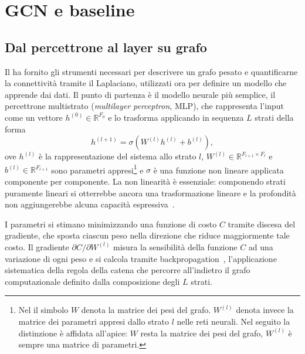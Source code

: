 \chapter{GCN e baseline}
\label{ch:forecasting-models}

\section{Dal percettrone al layer su grafo}
\label{sec:from-perceptron-to-graph-layer}

Il  ha fornito gli strumenti necessari per descrivere un grafo pesato e quantificarne la connettività tramite il Laplaciano, utilizzati ora per definire un modello che apprende dai dati. Il punto di partenza è il modello neurale più semplice, il percettrone multistrato (\emph{multilayer perceptron}, MLP), che rappresenta l'input come un vettore $h^{(0)}\in\mathbb{R}^{F_0}$ e lo trasforma applicando in sequenza $L$ strati della forma
\begin{equation}
\label{eq:mlp-layer}
h^{(l+1)} = \sigma\!\left(W^{(l)}h^{(l)} + b^{(l)}\right),
\end{equation}
ove $h^{(l)}$ è la rappresentazione del sistema allo strato $l$, $W^{(l)}\in\mathbb{R}^{F_{l+1}\times F_l}$ e $b^{(l)}\in\mathbb{R}^{F_{l+1}}$ sono parametri appresi\footnote{Nel  il simbolo $W$ denota la matrice dei pesi del grafo. $W^{(l)}$ denota invece la matrice dei parametri appresi dallo strato $l$ nelle reti neurali. Nel seguito la distinzione è affidata all'apice: $W$ resta la matrice dei pesi del grafo, $W^{(l)}$ è sempre una matrice di parametri.} e $\sigma$ è una funzione non lineare applicata componente per componente. La non linearità è essenziale: componendo strati puramente lineari si otterrebbe ancora una trasformazione lineare e la profondità non aggiungerebbe alcuna capacità espressiva~\cite{goodfellow2016deep}.

I parametri si stimano minimizzando una funzione di costo $C$ tramite discesa del gradiente, che sposta ciascun peso nella direzione che riduce maggiormente tale costo. Il gradiente $\partial C/\partial W^{(l)}$ misura la sensibilità della funzione $C$ ad una variazione di ogni peso e si calcola tramite backpropagation~\cite{rumelhart1986learning}, l'applicazione sistematica della regola della catena che percorre all'indietro il grafo computazionale definito dalla composizione degli $L$ strati.

